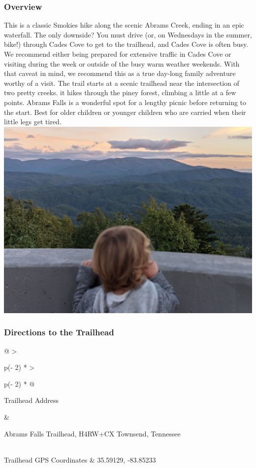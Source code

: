 \documentclass[
  letterpaper,
  DIV=11,
  numbers=noendperiod]{scrartcl}
\begin{document}
\hypertarget{overview-27}{%
\subsubsection{Overview}\label{overview-27}}

This is a classic Smokies hike along the scenic Abrams Creek, ending in
an epic waterfall. The only downside? You must drive (or, on Wednesdays
in the summer, bike!) through Cades Cove to get to the trailhead, and
Cades Cove is often busy. We recommend either being prepared for
extensive traffic in Cades Cove or visiting during the week or outside
of the busy warm weather weekends. With that caveat in mind, we
recommend this as a true day-long family adventure worthy of a visit.
The trail starts at a scenic trailhead near the intersection of two
pretty creeks. it hikes through the piney forest, climbing a little at a
few points. Abrams Falls is a wonderful spot for a lengthy picnic before
returning to the start. Best for older children or younger children who
are carried when their little legs get tired.
\includegraphics{img/trail-26-figure-01.jpg}

\hypertarget{directions-to-the-trailhead-27}{%
\subsubsection{Directions to the
Trailhead}\label{directions-to-the-trailhead-27}}

\begin{longtable}[]{@{}
  >{\raggedright\arraybackslash}p{(\columnwidth - 2\tabcolsep) * }
  >{\raggedright\arraybackslash}p{(\columnwidth - 2\tabcolsep) * }@{}}
\toprule\noalign{}
\begin{minipage}[b]{\linewidth}\raggedright
Trailhead Address
\end{minipage} & \begin{minipage}[b]{\linewidth}\raggedright
Abrams Falls Trailhead, H4RW+CX Townsend, Tennessee
\end{minipage} \\
\midrule\noalign{}
\endhead
\bottomrule\noalign{}
\endlastfoot
Trailhead GPS Coordinates & 35.59129, -83.85233 \\
\end{longtable}
\end{document}
